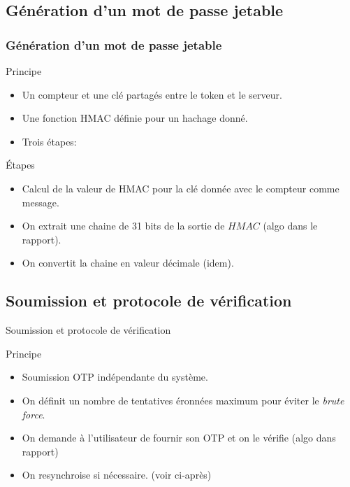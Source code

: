 \documentclass{beamer}
\begin{document}
\subsection{G\'en\'eration d'un mot de passe jetable}

\begin{frame}
\frametitle{G\'en\'eration d'un mot de passe jetable}
\begin{block}{Principe}
\begin{itemize}
\item Un compteur et une cl\'e partag\'es entre le token et le serveur.
\pause\item Une fonction HMAC d\'efinie pour un hachage donn\'e.
\pause\item Trois \'etapes:
\end{itemize}
\end{block}
\begin{exampleblock}{\'Etapes}
\begin{itemize}
\item Calcul de la valeur de HMAC pour la cl\'e donn\'ee avec le compteur comme message.
\pause \item On extrait une chaine de 31 bits de la sortie de $HMAC$ (algo dans le rapport).
\pause\item On convertit la chaine en valeur d\'ecimale (idem).
\end{itemize}
\end{exampleblock}
\end{frame}

 \subsection{Soumission et protocole de v\'erification}
 
 
 \begin{frame}{Soumission et protocole de v\'erification}
 \begin{block}{Principe}
 \begin{itemize}
 \item Soumission OTP ind\'ependante du syst\`eme.
 \pause \item On d\'efinit un nombre de tentatives \'eronn\'ees maximum pour \'eviter le \emph{brute force}.
 \pause\item On demande \`a l'utilisateur de fournir son OTP et on le v\'erifie (algo dans rapport)
 \pause\item On resynchroise si n\'ecessaire. (voir ci-apr\`es)
 \end{itemize}
 \end{block}
 
 \end{frame}
  
\end{document}
